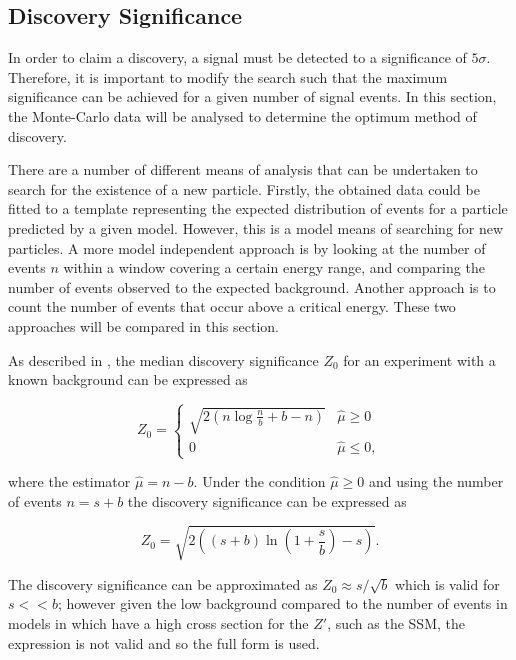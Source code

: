 \documentclass{article}
\begin{document}
\subsection{Discovery Significance}
\label{sec:MCA_Discovery}

In order to claim a discovery, a signal must be detected to a significance of $5\sigma$. Therefore, it is important to modify the search such that the maximum significance can be achieved for a given number of signal events. In this section, the Monte-Carlo data will be analysed to determine the optimum method of discovery.

There are a number of different means of analysis that can be undertaken to search for the existence of a new particle. Firstly, the obtained data could be fitted to a template representing the expected distribution of events for a particle predicted by a given model. However, this is a model  means of searching for new particles. A more model independent approach is by looking at the number of events $n$ within a window covering a certain energy range, and comparing the number of events observed to the expected background. Another approach is to count the number of events that occur above a critical energy. These two approaches will be compared in this section.

As described in \cite{Cowan:2010js}, the median discovery significance $Z_0$ for an experiment with a known background can be expressed as

\begin{equation}
Z_0 = \begin{cases}
    \sqrt{2\left(n\log\frac{n}{b}+b-n \right)} & \widehat{\mu}\geq0\\        0         & \widehat{\mu}\leq0,
\end{cases}
\end{equation}

where the estimator $\widehat{\mu}=n-b$. Under the condition $\widehat{\mu}\geq0$ and using the number of events $n=s+b$ the discovery significance can be expressed as 

\begin{equation}
Z_0 = \sqrt{2\left(  (s+b)\ln\left(1+\frac{s}{b}\right)  - s \right)}.
\label{eqn:asimov}
\end{equation}

The discovery significance can be approximated as $Z_0\approx s/\sqrt{b}$ which is valid for $s<<b$; however given the low background compared to the number of events in models in which have a high cross section for the $Z'$, such as the SSM, the expression is not valid and so the full form is used.
\end{document}

